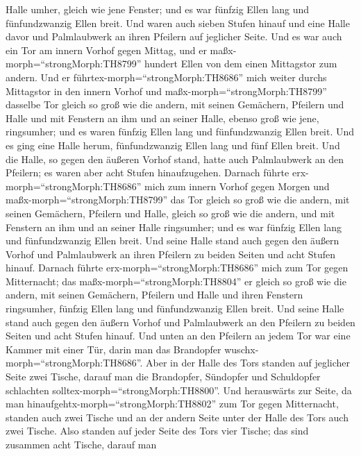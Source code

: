 Halle umher, gleich wie jene Fenster; und es war fünfzig Ellen lang und
fünfundzwanzig Ellen breit.  Und waren auch sieben Stufen
hinauf und eine Halle davor und Palmlaubwerk an ihren Pfeilern auf
jeglicher Seite.  Und es war auch ein Tor am innern Vorhof
gegen Mittag, und er maßx-morph=``strongMorph:TH8799'' hundert Ellen von
dem einen Mittagstor zum andern.  Und er
führtex-morph=``strongMorph:TH8686'' mich weiter durchs Mittagstor in
den innern Vorhof und maßx-morph=``strongMorph:TH8799'' dasselbe Tor
gleich so groß wie die andern,  mit seinen Gemächern,
Pfeilern und Halle und mit Fenstern an ihm und an seiner Halle, ebenso
groß wie jene, ringsumher; und es waren fünfzig Ellen lang und
fünfundzwanzig Ellen breit.  Und es ging eine Halle herum,
fünfundzwanzig Ellen lang und fünf Ellen breit.  Und die
Halle, so gegen den äußeren Vorhof stand, hatte auch Palmlaubwerk an den
Pfeilern; es waren aber acht Stufen hinaufzugehen.  Darnach
führte erx-morph=``strongMorph:TH8686'' mich zum innern Vorhof gegen
Morgen und maßx-morph=``strongMorph:TH8799'' das Tor gleich so groß wie
die andern,  mit seinen Gemächern, Pfeilern und Halle,
gleich so groß wie die andern, und mit Fenstern an ihm und an seiner
Halle ringsumher; und es war fünfzig Ellen lang und fünfundzwanzig Ellen
breit.  Und seine Halle stand auch gegen den äußern Vorhof
und Palmlaubwerk an ihren Pfeilern zu beiden Seiten und acht Stufen
hinauf.  Darnach führte erx-morph=``strongMorph:TH8686''
mich zum Tor gegen Mitternacht; das maßx-morph=``strongMorph:TH8804'' er
gleich so groß wie die andern,  mit seinen Gemächern,
Pfeilern und Halle und ihren Fenstern ringsumher, fünfzig Ellen lang und
fünfundzwanzig Ellen breit.  Und seine Halle stand auch
gegen den äußern Vorhof und Palmlaubwerk an den Pfeilern zu beiden
Seiten und acht Stufen hinauf.  Und unten an den Pfeilern
an jedem Tor war eine Kammer mit einer Tür, darin man das Brandopfer
wuschx-morph=``strongMorph:TH8686''.  Aber in der Halle des
Tors standen auf jeglicher Seite zwei Tische, darauf man die Brandopfer,
Sündopfer und Schuldopfer schlachten
solltex-morph=``strongMorph:TH8800''.  Und herauswärts zur
Seite, da man hinaufgehtx-morph=``strongMorph:TH8802'' zum Tor gegen
Mitternacht, standen auch zwei Tische und an der andern Seite unter der
Halle des Tors auch zwei Tische.  Also standen auf jeder
Seite des Tors vier Tische; das sind zusammen acht Tische, darauf man

